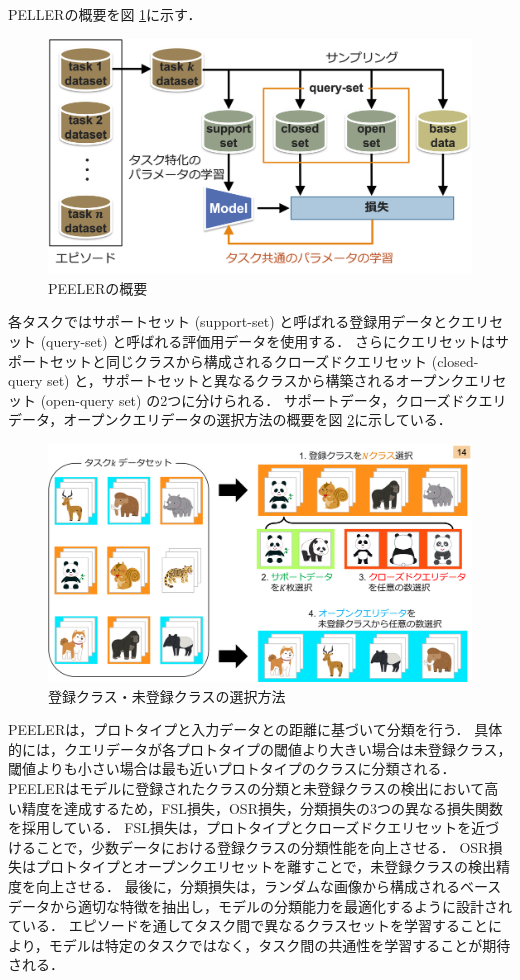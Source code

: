 \documentclass[a4paper,11pt,nomag]{jsreport}
\begin{document}
PELLERの概要を図 \ref{fig:peeler}に示す．
% 
\begin{figure}[tbp]
  \centering
  \includegraphics[width=\linewidth, keepaspectratio]{image/peeler.png}
  \caption{PEELERの概要}
  \label{fig:peeler}
\end{figure}
% 
各タスクではサポートセット (support-set) と呼ばれる登録用データとクエリセット (query-set) と呼ばれる評価用データを使用する．
さらにクエリセットはサポートセットと同じクラスから構成されるクローズドクエリセット (closed-query set) と，サポートセットと異なるクラスから構築されるオープンクエリセット (open-query set) の2つに分けられる．
サポートデータ，クローズドクエリデータ，オープンクエリデータの選択方法の概要を図 \ref{fig:peeler_data}に示している．
% 
\begin{figure}[tbp]
  \centering
  \includegraphics[width=\linewidth, keepaspectratio]{image/meta-class.png}
  \caption{登録クラス・未登録クラスの選択方法}
  \label{fig:peeler_data}
\end{figure}
%
PEELERは，プロトタイプと入力データとの距離に基づいて分類を行う．
具体的には，クエリデータが各プロトタイプの閾値より大きい場合は未登録クラス，閾値よりも小さい場合は最も近いプロトタイプのクラスに分類される．
PEELERはモデルに登録されたクラスの分類と未登録クラスの検出において高い精度を達成するため，FSL損失，OSR損失，分類損失の3つの異なる損失関数を採用している．
FSL損失は，プロトタイプとクローズドクエリセットを近づけることで，少数データにおける登録クラスの分類性能を向上させる．
OSR損失はプロトタイプとオープンクエリセットを離すことで，未登録クラスの検出精度を向上させる．
最後に，分類損失は，ランダムな画像から構成されるベースデータから適切な特徴を抽出し，モデルの分類能力を最適化するように設計されている．
エピソードを通してタスク間で異なるクラスセットを学習することにより，モデルは特定のタスクではなく，タスク間の共通性を学習することが期待される．
\end{document}
